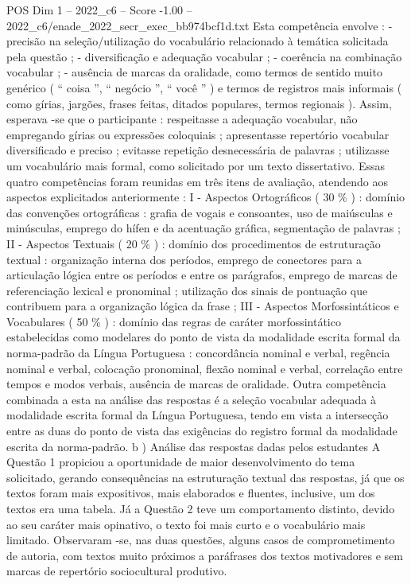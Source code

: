\begin{textsample}{POS Dim 1 – 2022\_c6 – Score -1.00 – 2022\_c6/enade\_2022\_secr\_exec\_bb974bcf1d.txt}
Esta competência envolve : - precisão na seleção/utilização do vocabulário relacionado à temática solicitada pela questão ; - diversificação e adequação vocabular ; - coerência na combinação vocabular ; - ausência de marcas da oralidade, como termos de sentido muito genérico ( “ coisa ”, “ negócio ”, “ você ” ) e termos de registros mais informais ( como gírias, jargões, frases feitas, ditados populares, termos regionais ).
Assim, esperava -se que o participante : respeitasse a adequação vocabular, não empregando gírias ou expressões coloquiais ; apresentasse repertório vocabular diversificado e preciso ; evitasse repetição desnecessária de palavras ; utilizasse um vocabulário mais formal, como solicitado por um texto dissertativo.
Essas quatro competências foram reunidas em três itens de avaliação, atendendo aos aspectos explicitados anteriormente : I - Aspectos Ortográficos ( 30 \% ) : domínio das convenções ortográficas : grafia de vogais e consoantes, uso de maiúsculas e minúsculas, emprego do hífen e da acentuação gráfica, segmentação de palavras ; II - Aspectos Textuais ( 20 \% ) : domínio dos procedimentos de estruturação textual : organização interna dos períodos, emprego de conectores para a articulação lógica entre os períodos e entre os parágrafos, emprego de marcas de referenciação lexical e pronominal ; utilização dos sinais de pontuação que contribuem para a organização lógica da frase ; III - Aspectos Morfossintáticos e Vocabulares ( 50 \% ) : domínio das regras de caráter morfossintático estabelecidas como modelares do ponto de vista da modalidade escrita formal da norma-padrão da Língua Portuguesa : concordância nominal e verbal, regência nominal e verbal, colocação pronominal, flexão nominal e verbal, correlação entre tempos e modos verbais, ausência de marcas de oralidade.
Outra competência combinada a esta na análise das respostas é a seleção vocabular adequada à modalidade escrita formal da Língua Portuguesa, tendo em vista a intersecção entre as duas do ponto de vista das exigências do registro formal da modalidade escrita da norma-padrão. b ) Análise das respostas dadas pelos estudantes A Questão 1 propiciou a oportunidade de maior desenvolvimento do tema solicitado, gerando consequências na estruturação textual das respostas, já que os textos foram mais expositivos, mais elaborados e fluentes, inclusive, um dos textos era uma tabela.
Já a Questão 2 teve um comportamento distinto, devido ao seu caráter mais opinativo, o texto foi mais curto e o vocabulário mais limitado.
Observaram -se, nas duas questões, alguns casos de comprometimento de autoria, com textos muito próximos a paráfrases dos textos motivadores e sem marcas de repertório sociocultural produtivo.

\end{textsample}
